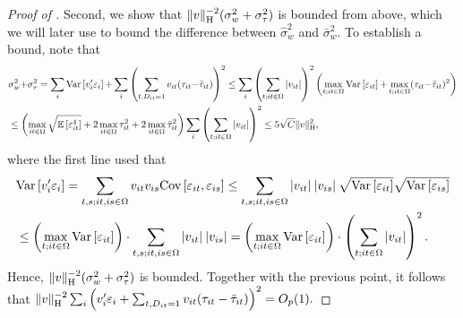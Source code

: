 \documentclass[english,11pt]{article}
\theoremstyle{plain}
\theoremstyle{plain}
\theoremstyle{plain}
\theoremstyle{plain}
\let\ref\Cref
\begin{document}
\begin{proof}[Proof of \ref{thm:se}]
Second, we show that $\|v\|_{\textnormal{H}}^{-2}(\sigma_{w}^{2}+\sigma_{\tau}^{2})$
is bounded from above, which we will later use to bound the difference
between $\hat{\sigma}_{w}^{2}$ and $\bar{\sigma}_{w}^{2}$. To establish
a bound, note that
\begin{align*}
 & \sigma_{w}^{2}{+}\sigma_{\tau}^{2}=\sum_{i}\mathrm{Var}\left[v_{i}'\varepsilon_{i}\right]{+}\sum_{i}\left(\sum_{t,D_{it}=1}v_{it}(\tau_{it}{-}\bar{\tau}_{it})\right)^{2}\leq\sum_{i}\left(\sum_{t;it\in\Omega}|v_{it}|\right)^{2}\left(\max_{t;it\in\Omega}\mathrm{Var}\left[\varepsilon_{it}\right]{+}\max_{t;it\in\Omega}(\tau_{it}{-}\bar{\tau}_{it})^{2}\right)\\
 & \leq\left(\max_{it\in\Omega}\sqrt{\mathbb{E}\left[\varepsilon_{it}^{4}\right]}+2\max_{it\in\Omega}\tau_{it}^{2}+2\max_{it\in\Omega}\bar{\tau}_{it}^{2}\right)\sum_{i}\left(\sum_{t;it\in\Omega}|v_{it}|\right)^{2}\leq5\sqrt{C}\|v\|_{\textnormal{H}}^{2},
\end{align*}
where the first line used that 
\begin{align*}
 & \mathrm{Var}\left[v_{i}'\varepsilon_{i}\right]=\sum_{t,s;it,is\in\Omega}v_{it}v_{is}\mathrm{Cov}\left[\varepsilon_{it},\varepsilon_{is}\right]\leq\sum_{t,s;it,is\in\Omega}|v_{it}|\:|v_{is}|\:\sqrt{\mathrm{Var}\left[\varepsilon_{it}\right]}\sqrt{\mathrm{Var}\left[\varepsilon_{is}\right]}\\
 & \leq\left(\max_{t;it\in\Omega}\mathrm{Var}\left[\varepsilon_{it}\right]\right)\cdot\sum_{t,s;it,is\in\Omega}|v_{it}|\:|v_{is}|=\left(\max_{t;it\in\Omega}\mathrm{Var}\left[\varepsilon_{it}\right]\right)\cdot\left(\sum_{t;it\in\Omega}|v_{it}|\right)^{2}.
\end{align*}
Hence, $\|v\|_{\textnormal{H}}^{-2}(\sigma_{w}^{2}+\sigma_{\tau}^{2})$ is bounded.
Together with the previous point, it follows that $\|v\|_{\textnormal{H}}^{-2}\allowbreak\sum_{i}\left(v_{i}'\varepsilon_{i}\allowbreak+\sum_{t,D_{it}=1}v_{it}(\tau_{it}-\bar{\tau}_{it})\right)^{2}=O_{p}(1).$


\end{proof}
\end{document}
